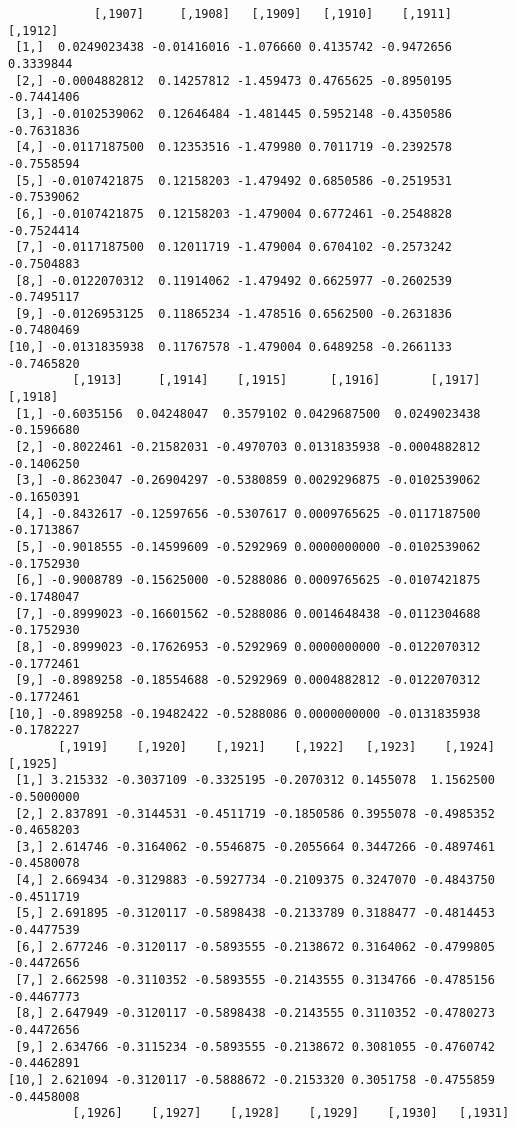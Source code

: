 \documentclass[
  letterpaper,
  DIV=11,
  numbers=noendperiod]{scrreprt}
\begin{document}
\begin{verbatim}
            [,1907]     [,1908]   [,1909]   [,1910]    [,1911]    [,1912]
 [1,]  0.0249023438 -0.01416016 -1.076660 0.4135742 -0.9472656  0.3339844
 [2,] -0.0004882812  0.14257812 -1.459473 0.4765625 -0.8950195 -0.7441406
 [3,] -0.0102539062  0.12646484 -1.481445 0.5952148 -0.4350586 -0.7631836
 [4,] -0.0117187500  0.12353516 -1.479980 0.7011719 -0.2392578 -0.7558594
 [5,] -0.0107421875  0.12158203 -1.479492 0.6850586 -0.2519531 -0.7539062
 [6,] -0.0107421875  0.12158203 -1.479004 0.6772461 -0.2548828 -0.7524414
 [7,] -0.0117187500  0.12011719 -1.479004 0.6704102 -0.2573242 -0.7504883
 [8,] -0.0122070312  0.11914062 -1.479492 0.6625977 -0.2602539 -0.7495117
 [9,] -0.0126953125  0.11865234 -1.478516 0.6562500 -0.2631836 -0.7480469
[10,] -0.0131835938  0.11767578 -1.479004 0.6489258 -0.2661133 -0.7465820
         [,1913]     [,1914]    [,1915]      [,1916]       [,1917]    [,1918]
 [1,] -0.6035156  0.04248047  0.3579102 0.0429687500  0.0249023438 -0.1596680
 [2,] -0.8022461 -0.21582031 -0.4970703 0.0131835938 -0.0004882812 -0.1406250
 [3,] -0.8623047 -0.26904297 -0.5380859 0.0029296875 -0.0102539062 -0.1650391
 [4,] -0.8432617 -0.12597656 -0.5307617 0.0009765625 -0.0117187500 -0.1713867
 [5,] -0.9018555 -0.14599609 -0.5292969 0.0000000000 -0.0102539062 -0.1752930
 [6,] -0.9008789 -0.15625000 -0.5288086 0.0009765625 -0.0107421875 -0.1748047
 [7,] -0.8999023 -0.16601562 -0.5288086 0.0014648438 -0.0112304688 -0.1752930
 [8,] -0.8999023 -0.17626953 -0.5292969 0.0000000000 -0.0122070312 -0.1772461
 [9,] -0.8989258 -0.18554688 -0.5292969 0.0004882812 -0.0122070312 -0.1772461
[10,] -0.8989258 -0.19482422 -0.5288086 0.0000000000 -0.0131835938 -0.1782227
       [,1919]    [,1920]    [,1921]    [,1922]   [,1923]    [,1924]    [,1925]
 [1,] 3.215332 -0.3037109 -0.3325195 -0.2070312 0.1455078  1.1562500 -0.5000000
 [2,] 2.837891 -0.3144531 -0.4511719 -0.1850586 0.3955078 -0.4985352 -0.4658203
 [3,] 2.614746 -0.3164062 -0.5546875 -0.2055664 0.3447266 -0.4897461 -0.4580078
 [4,] 2.669434 -0.3129883 -0.5927734 -0.2109375 0.3247070 -0.4843750 -0.4511719
 [5,] 2.691895 -0.3120117 -0.5898438 -0.2133789 0.3188477 -0.4814453 -0.4477539
 [6,] 2.677246 -0.3120117 -0.5893555 -0.2138672 0.3164062 -0.4799805 -0.4472656
 [7,] 2.662598 -0.3110352 -0.5893555 -0.2143555 0.3134766 -0.4785156 -0.4467773
 [8,] 2.647949 -0.3120117 -0.5898438 -0.2143555 0.3110352 -0.4780273 -0.4472656
 [9,] 2.634766 -0.3115234 -0.5893555 -0.2138672 0.3081055 -0.4760742 -0.4462891
[10,] 2.621094 -0.3120117 -0.5888672 -0.2153320 0.3051758 -0.4755859 -0.4458008
         [,1926]    [,1927]    [,1928]    [,1929]    [,1930]   [,1931]

\end{verbatim}
\end{document}
